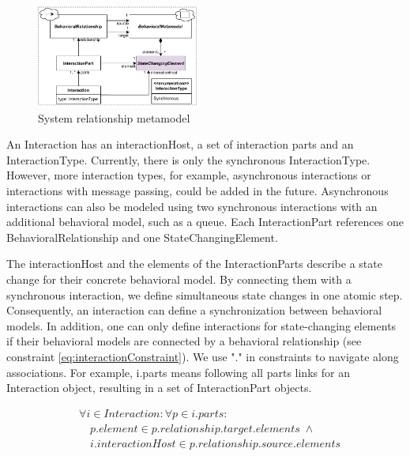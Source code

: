 \documentclass{jot}
\begin{document}
\begin{figure}[h]
    \centering
    \includegraphics[width=0.475\textwidth]{figures/srm_metamodel_composition.pdf}
    \caption{System relationship metamodel}
    \label{fig:srm_metamodel}
\end{figure}

An \textsf{Interaction} has an \textsf{interactionHost}, a set of interaction \textsf{parts} and an \textsf{InteractionType}.
Currently, there is only the \textsf{synchronous} \textsf{InteractionType}.
However, more interaction types, for example, asynchronous interactions or interactions with message passing, could be added in the future.
Asynchronous interactions can also be modeled using two synchronous interactions with an additional behavioral model, such as a queue.
Each \textsf{InteractionPart} references one \textsf{BehavioralRelationship} and one \textsf{StateChangingElement}.

The \textsf{interactionHost} and the elements of the \textsf{InteractionPart}s describe a state change for their concrete behavioral model.
By connecting them with a synchronous interaction, we define simultaneous state changes in one atomic step. 
Consequently, an interaction can define a synchronization between behavioral models.
In addition, one can only define interactions for state-changing elements if their behavioral models are connected by a behavioral relationship (see constraint \eqref{eq:interactionConstraint}).
We use "." in constraints to navigate along associations.
For example, \textsf{i.parts} means following all \textsf{parts} links for an \textsf{Interaction} object, resulting in a set of \textsf{InteractionPart} objects.

\begin{equation} \label{eq:interactionConstraint}
    \begin{aligned}
    & \forall i \in Interaction: \forall p \in i.parts : \\
    & \quad p.element \in p.relationship.target.elements \; \wedge \\
    & \quad i.interactionHost \in p.relationship.source.elements
    \end{aligned}
\end{equation}
\end{document}
